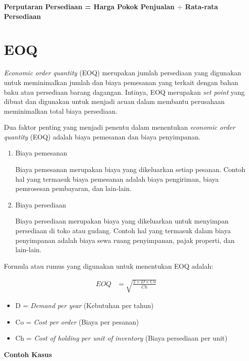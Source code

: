 \textbf{Perputaran Persediaan = Harga Pokok Penjualan $\div$ Rata-rata Persediaan}

\section{EOQ}

\textit{Economic order quantity} (EOQ) merupakan jumlah persediaan yang digunakan untuk meminimalkan jumlah dan biaya pemesanan yang terkait dengan bahan baku atau persediaan barang dagangan. Intinya, EOQ merupakan \textit{set point} yang dibuat dan digunakan untuk menjadi acuan dalam membantu perusahaan meminimalkan total biaya persediaan.

Dua faktor penting yang menjadi penentu dalam menentukan \textit{economic order quantity} (EOQ) adalah biaya pemesanan dan biaya penyimpanan.

\begin{enumerate}
	\item Biaya pemesanan
	
	Biaya pemesanan merupakan biaya yang dikeluarkan setiap pesanan. Contoh hal yang termasuk biaya pemesanan adalah biaya pengiriman, biaya pemrosesan pembayaran, dan lain-lain.

	\item Biaya persediaan
	
	Biaya persediaan merupakan biaya yang dikeluarkan untuk menyimpan persediaan di toko atau gudang. Contoh hal yang termasuk dalam biaya penyimpanan adalah biaya sewa ruang penyimpanan, pajak properti, dan lain-lain.
\end{enumerate}

Formula atau rumus yang digunakan untuk menentukan EOQ adalah:

\begin{equation}
    \begin{split}
		EOQ
		&= \sqrt{\frac{2 \times D \times Co}{Ch}}
    \end{split}
\end{equation}

\begin{itemize}
	\item D = \textit{Demand per year} (Kebutuhan per tahun)
	\item Co = \textit{Cost per order} (Biaya per pesanan)
	\item Ch = \textit{Cost of holding per unit of inventory} (Biaya persediaan per unit)
\end{itemize}

\textbf{Contoh Kasus}

